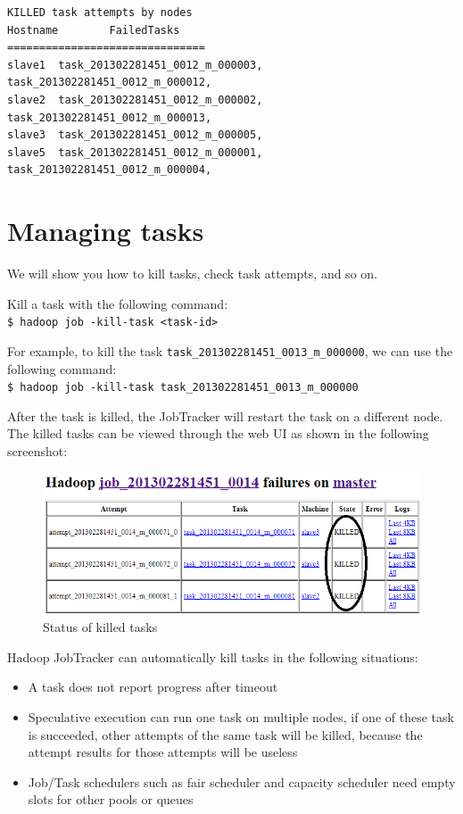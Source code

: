 \begin{verbatim}
KILLED task attempts by nodes
Hostname        FailedTasks
===============================
slave1  task_201302281451_0012_m_000003, task_201302281451_0012_m_000012,
slave2  task_201302281451_0012_m_000002, task_201302281451_0012_m_000013,
slave3  task_201302281451_0012_m_000005,
slave5  task_201302281451_0012_m_000001, task_201302281451_0012_m_000004,
\end{verbatim}

\section{Managing tasks}
We will show you how to kill tasks, check task attempts, and so on. 

Kill a task with the following command: \\
\verb|$ hadoop job -kill-task <task-id> |

For example, to kill the task \verb|task_201302281451_0013_m_000000|, we can use the following command: \\ 
\verb|$ hadoop job -kill-task task_201302281451_0013_m_000000|

After the task is killed, the JobTracker will restart the task on a different node. The killed tasks can be viewed through the web UI as shown in the following screenshot:
\begin{figure}[h]
  \centering
  \includegraphics[width=\textwidth]{figs/5163OS_04_14.png}
  \caption{Status of killed tasks}\label{fig:mapred.killed.tasks}
\end{figure} 


Hadoop JobTracker can automatically kill tasks in the following situations:
\begin{itemize}
  \item A task does not report progress after timeout
  \item Speculative execution can run one task on multiple nodes, if one of these task is succeeded, other attempts of the same task will be killed, because the attempt results for those attempts will be useless
  \item Job/Task schedulers such as fair scheduler and capacity scheduler need empty slots for other pools or queues
\end{itemize}

